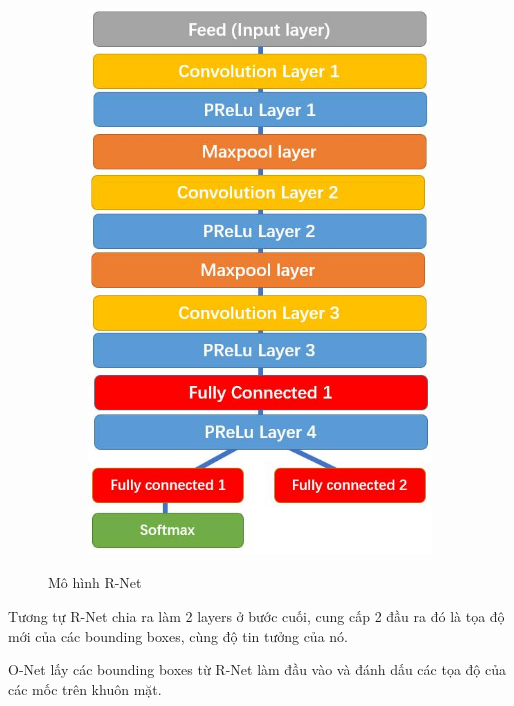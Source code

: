 \begin{figure}
    \begin{subfigure}{1.\textwidth}
        \begin{center}
            \includegraphics[width=0.6\linewidth]{Chapters/items/chap2_11.jpg}
        \end{center}
        \label{fig:chap2_11}
    \end{subfigure}
    \caption{Mô hình R-Net}
\end{figure}

\newpage
Tương tự R-Net chia ra làm 2 layers ở bước cuối, cung cấp 2 đầu ra đó là tọa độ
mới của các bounding boxes, cùng độ tin tưởng của nó.

O-Net lấy các bounding boxes từ R-Net làm đầu vào và đánh dấu các tọa độ của các mốc trên khuôn mặt.

